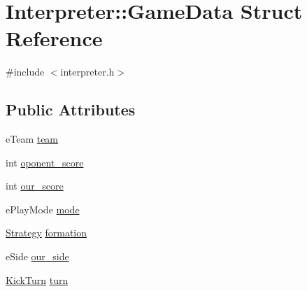 \hypertarget{structInterpreter_1_1GameData}{
\section{Interpreter::GameData Struct Reference}
\label{structInterpreter_1_1GameData}
}


{\ttfamily \#include $<$interpreter.h$>$}

\subsection*{Public Attributes}
\begin{DoxyCompactItemize}
\item 
eTeam \hyperlink{structInterpreter_1_1GameData_a42e23781bbc08a16049f0478ba300424}{team}
\item 
int \hyperlink{structInterpreter_1_1GameData_adae988f2e4ebdf1d6b04d36a85f76708}{oponent\_\-score}
\item 
int \hyperlink{structInterpreter_1_1GameData_a0889548c1244e619028c24f7e8b1a9a7}{our\_\-score}
\item 
ePlayMode \hyperlink{structInterpreter_1_1GameData_a8db07331590b8e0acea1af74125073c0}{mode}
\item 
\hyperlink{classInterpreter_a0fb49436c8c14ca79e13f1cd78119088}{Strategy} \hyperlink{structInterpreter_1_1GameData_a1f97ae8675219e99c79735a7d9c3744b}{formation}
\item 
eSide \hyperlink{structInterpreter_1_1GameData_a92de919c4addb12feda7a29e40b95132}{our\_\-side}
\item 
\hyperlink{classInterpreter_ac7c3ba77d973ffbb84b12db662cfe643}{KickTurn} \hyperlink{structInterpreter_1_1GameData_a149f7f05ee020674156346057e9b60ba}{turn}
\end{DoxyCompactItemize}


